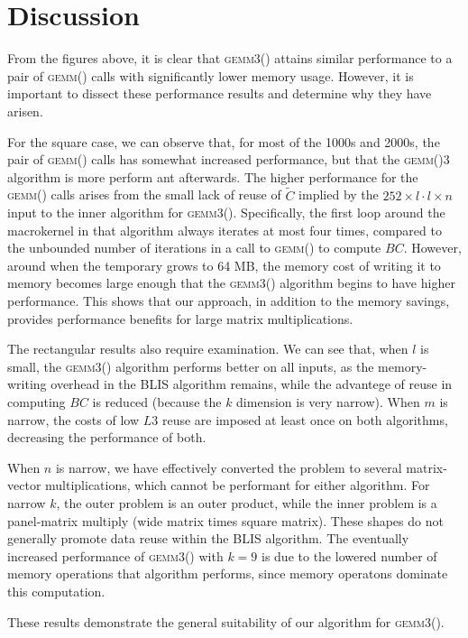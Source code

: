 \documentclass[12pt]{article}
\newcommand*{\gemmt}{{\textsc{gemm3()}}}
\newcommand*{\gemm}{{\textsc{gemm()}}}
\begin{document}
\section{Discussion}
From the figures above, it is clear that \gemmt{} attains similar performance to a pair of \gemm{} calls with significantly lower memory usage.
However, it is important to dissect these performance results and determine why they have arisen.

For the square case, we can observe that, for most of the 1000s and 2000s, the pair of \gemm{} calls has somewhat increased performance, but that the \gemm3{} algorithm is more perform ant afterwards.
The higher performance for the \gemm{} calls arises from the small lack of reuse of $\tilde{C}$ implied by the $252 \times l \cdot l \times n$ input to the inner algorithm for \gemmt{}.
Specifically, the first loop around the macrokernel in that algorithm always iterates at most four times, compared to the unbounded number of iterations in a call to \gemm{} to compute $BC$.
However, around when the temporary grows to 64 MB, the memory cost of writing it to memory becomes large enough that the \gemmt{} algorithm begins to have higher performance.
This shows that our approach, in addition to the memory savings, provides performance benefits for large matrix multiplications.

The rectangular results also require examination.
We can see that, when $l$ is small, the \gemmt{} algorithm performs better on all inputs, as the memory-writing overhead in the BLIS algorithm remains, while the advantege of reuse in computing $BC$ is reduced (because the $k$ dimension is very narrow).
When $m$ is narrow, the costs of low $L3$ reuse are imposed at least once on both algorithms, decreasing the performance of both.

When $n$ is narrow, we have effectively converted the problem to several matrix-vector multiplications, which cannot be performant for either algorithm.
For narrow $k$, the outer problem is an outer product, while the inner problem is a panel-matrix multiply (wide matrix times square matrix).
These shapes do not generally promote data reuse within the BLIS algorithm.
The eventually increased performance of \gemmt{} with $k = 9$ is due to the lowered number of memory operations that algorithm performs, since memory operatons dominate this computation.

These results demonstrate the general suitability of our algorithm for \gemmt{}.
\end{document}
